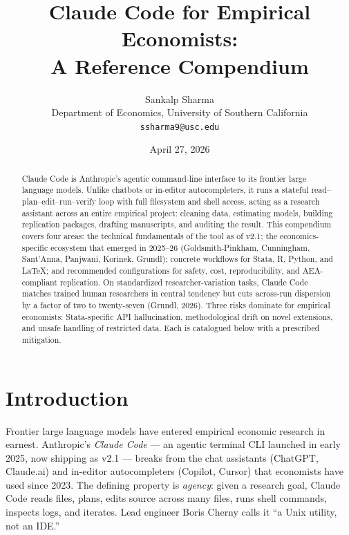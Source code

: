 \documentclass[11pt]{article}
\title{\textbf{Claude Code for Empirical Economists:\\ A Reference Compendium}}
\author{Sankalp Sharma\\ Department of Economics, University of Southern California\\ \texttt{ssharma9@usc.edu}}
\date{April 27, 2026}
\begin{document}
\maketitle

\begin{abstract}
\noindent Claude Code is Anthropic's agentic command-line interface to its frontier large language models. Unlike chatbots or in-editor autocompleters, it runs a stateful read--plan--edit--run--verify loop with full filesystem and shell access, acting as a research assistant across an entire empirical project: cleaning data, estimating models, building replication packages, drafting manuscripts, and auditing the result. This compendium covers four areas: the technical fundamentals of the tool as of v2.1; the economics-specific ecosystem that emerged in 2025--26 (Goldsmith-Pinkham, Cunningham, Sant'Anna, Panjwani, Korinek, Grundl); concrete workflows for Stata, R, Python, and \LaTeX; and recommended configurations for safety, cost, reproducibility, and AEA-compliant replication. On standardized researcher-variation tasks, Claude Code matches trained human researchers in central tendency but cuts across-run dispersion by a factor of two to twenty-seven (Grundl, 2026). Three risks dominate for empirical economists: Stata-specific API hallucination, methodological drift on novel extensions, and unsafe handling of restricted data. Each is catalogued below with a prescribed mitigation.
\end{abstract}

\tableofcontents
\newpage

\section{Introduction}

Frontier large language models have entered empirical economic research in earnest. Anthropic's \emph{Claude Code} --- an agentic terminal CLI launched in early 2025, now shipping as v2.1 --- breaks from the chat assistants (ChatGPT, Claude.ai) and in-editor autocompleters (Copilot, Cursor) that economists have used since 2023. The defining property is \emph{agency}: given a research goal, Claude Code reads files, plans, edits source across many files, runs shell commands, inspects logs, and iterates. Lead engineer Boris Cherny calls it ``a Unix utility, not an IDE.''
\end{document}
